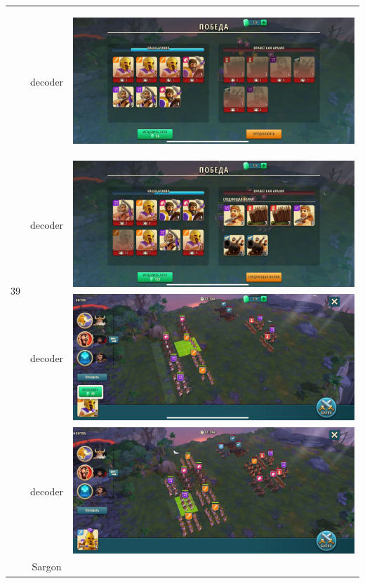 \begin{longtable}{|c|c|c|}
    \hline
    \multirow{8}{*}{39} & decoder &
    \hypertarget{fight39}{\includegraphics[width=0.75\linewidth]{./parts/media/TreasureHunt/39/decoder/photo_2022-04-07_13-15-43.jpg}} \\
    & decoder &
    \includegraphics[width=0.75\linewidth]{./parts/media/TreasureHunt/39/decoder/photo_2022-04-07_13-15-36.jpg} \\
    & decoder &
    \includegraphics[width=0.75\linewidth]{./parts/media/TreasureHunt/39/decoder/photo_2022-04-07_13-15-39.jpg} \\
    & decoder &
    \includegraphics[width=0.75\linewidth]{./parts/media/TreasureHunt/39/decoder/photo_2022-04-07_13-15-27.jpg} \\
    \hline
    \multirow{8}{*}{39} & Sargon &

\end{longtable}
